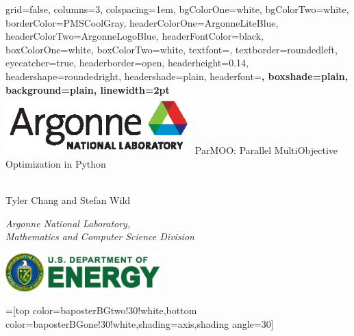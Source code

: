 \documentclass[a0paper,landscape]{baposter}
\begin{document}
\begin{poster}{
  grid=false,
  columns=3,
  colspacing=1em,
  bgColorOne=white,
  bgColorTwo=white,
  borderColor=PMSCoolGray,
  headerColorOne=ArgonneLiteBlue,
  headerColorTwo=ArgonneLogoBlue,
  headerFontColor=black,
  boxColorOne=white,
  boxColorTwo=white,
  textfont=\large,
  textborder=roundedleft,
  eyecatcher=true,
  headerborder=open,
  headerheight=0.14\textheight,
  headershape=roundedright,
  headershade=plain,
  headerfont=\Large\sf\bf, %
  boxshade=plain,
  background=plain,
  linewidth=2pt
  }
  {\includegraphics[height=6em]{../img/logos/Argonne_cmyk_black.eps}} %
  {\sf ParMOO: Parallel MultiObjective Optimization in Python\\$\quad$}
  {\sf  \phantom{\hspace{0em}}
    Tyler Chang and Stefan Wild\\

    \smallskip

    {\it \small
    Argonne National Laboratory,\\
    Mathematics and Computer Science Division
    \par
    }

  }
  {
    \includegraphics[height=4em]{../img/logos/DOE_logo_color_cmyk.eps}
  }

  =[top color=baposterBGtwo!30!white,bottom color=baposterBGone!30!white,shading=axis,shading angle=30]

 \newlength{\leftimgwidth}
 \setlength{\leftimgwidth}{0.78em+8.0em}
 
 \newcommand{\thebox}{\stepcounter{boxnum} \arabic{boxnum}. }


\end{poster}
\end{document}
